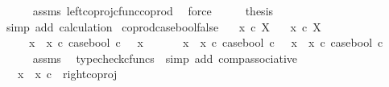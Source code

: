 \begin{isabellebody}
\ \ \ \ \isamarkupfalse%
\ assms\ left{\isacharunderscore}{\kern0pt}coproj{\isacharunderscore}{\kern0pt}cfunc{\isacharunderscore}{\kern0pt}coprod\ \isamarkupfalse%
\ force\isanewline
\ \ \isamarkupfalse%
\ \isamarkupfalse%
\ {\isacharquery}{\kern0pt}thesis\isanewline
\ \ \ \ \isamarkupfalse%
\ {\isacharparenleft}{\kern0pt}simp\ add{\isacharcolon}{\kern0pt}\ calculation{\isacharparenright}{\kern0pt}\isanewline
{}\isamarkupfalse%
%
\endisatagproof
{\isafoldproof}%
%
\isadelimproof
\isanewline
%
\endisadelimproof
\isanewline
{}\isamarkupfalse%
\ coprod{\isacharunderscore}{\kern0pt}case{\isacharunderscore}{\kern0pt}bool{\isacharunderscore}{\kern0pt}false{\isacharcolon}{\kern0pt}\isanewline
\ \ \ {\isachardoublequoteopen}x{}\ {\isasymin}\isactrlsub c\ X{\isachardoublequoteclose}\isanewline
\ \ \ {\isachardoublequoteopen}x{}\ {\isasymin}\isactrlsub c\ X{\isachardoublequoteclose}\isanewline
\ \ \ \ \ {\isachardoublequoteopen}{\isacharparenleft}{\kern0pt}x{}\ {\isasymamalg}\ x{}\ {\isasymcirc}\isactrlsub c\ case{\isacharunderscore}{\kern0pt}bool{\isacharparenright}{\kern0pt}\ {\isasymcirc}\isactrlsub c\ {\isasymf}\ {\isacharequal}{\kern0pt}\ x{}{\isachardoublequoteclose}\isanewline
%
\isadelimproof
%
\endisadelimproof
%
\isatagproof
{}\isamarkupfalse%
\ {\isacharminus}{\kern0pt}\ \isanewline
\ \ \isamarkupfalse%
\ {\isachardoublequoteopen}{\isacharparenleft}{\kern0pt}x{}\ {\isasymamalg}\ x{}\ {\isasymcirc}\isactrlsub c\ case{\isacharunderscore}{\kern0pt}bool{\isacharparenright}{\kern0pt}\ {\isasymcirc}\isactrlsub c\ {\isasymf}\ {\isacharequal}{\kern0pt}\ {\isacharparenleft}{\kern0pt}x{}\ {\isasymamalg}\ x{}{\isacharparenright}{\kern0pt}\ {\isasymcirc}\isactrlsub c\ case{\isacharunderscore}{\kern0pt}bool\ {\isasymcirc}\isactrlsub c\ {\isasymf}{\isachardoublequoteclose}\isanewline
\ \ \ \ \isamarkupfalse%
\ assms\ \isamarkupfalse%
\ {\isacharparenleft}{\kern0pt}typecheck{\isacharunderscore}{\kern0pt}cfuncs\ {\isacharcomma}{\kern0pt}\ simp\ add{\isacharcolon}{\kern0pt}\ comp{\isacharunderscore}{\kern0pt}associative{}{\isacharparenright}{\kern0pt}\isanewline
\ \ \isamarkupfalse%
\ \isamarkupfalse%
\ {\isachardoublequoteopen}{\isachardot}{\kern0pt}{\isachardot}{\kern0pt}{\isachardot}{\kern0pt}\ {\isacharequal}{\kern0pt}\ {\isacharparenleft}{\kern0pt}x{}\ {\isasymamalg}\ x{}{\isacharparenright}{\kern0pt}\ {\isasymcirc}\isactrlsub c\ \ right{\isacharunderscore}{\kern0pt}coproj\ {\isasymone}\ {\isasymone}{\isachardoublequoteclose}\isanewline

\end{isabellebody}
